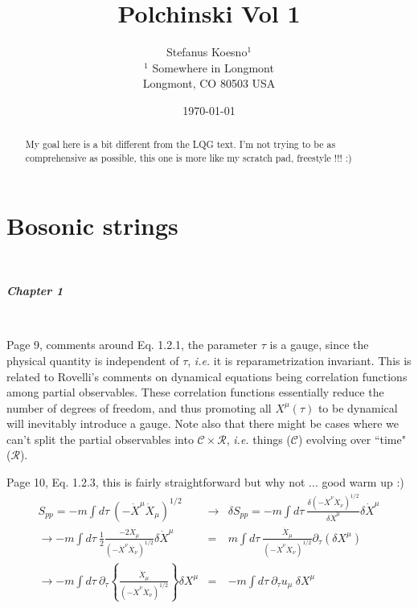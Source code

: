\documentclass[aps,preprint,preprintnumbers,nofootinbib,showpacs,prd]{revtex4-1}
\newcommand{\ie}{{\it i.e.} }
\newcommand{\nbea}{\begin{eqnarray*}}
\newcommand{\neea}{\end{eqnarray*}}
\begin{document}
\title{Polchinski Vol 1}
\bigskip
\author{Stefanus Koesno$^1$\\
$^1$ Somewhere in Longmont\\ Longmont, CO 80503 USA\\
}
%
\date{\today}
%
\begin{abstract}
My goal here is a bit different from the LQG text. I'm not trying to be as comprehensive as possible, this one is more like my scratch pad, freestyle !!! :)

\end{abstract}
%
\maketitle

\section{Bosonic strings}

\renewcommand{\theequation}{A.\arabic{equation}}  %
\setcounter{equation}{0}  %

{\ }

\textbf{\textit {Chapter 1}}

{\ }

Page 9, comments around Eq. 1.2.1, the parameter $\tau$ is a gauge, since the physical quantity is independent of $\tau$, \ie it is reparametrization invariant. This is related to Rovelli's comments on dynamical equations being correlation functions among partial observables. These correlation functions essentially reduce the number of degrees of freedom, and thus promoting all $X^\mu(\tau)$ to be dynamical will inevitably introduce a gauge. Note also that there might be cases where we can't split the partial observables into $\mathcal{C} \times \mathcal{R}$, \ie things ($\mathcal{C}$) evolving over ``time" ($\mathcal{R}$).

Page 10, Eq. 1.2.3, this is fairly straightforward but why not ... good warm up :)
%
\nbea
S_{pp} = -m \int d\tau~\left ( - \dot X^\mu \dot X_\mu \right ) ^{1/2} & \rightarrow & \delta S_{pp} = -m \int d\tau~ \frac {\delta \left ( - \dot X^\nu \dot X_\nu \right ) ^{1/2}} {\delta \dot X^\mu} \delta \dot X^\mu\\
\rightarrow -m \int d\tau~ \frac{1}{2}\frac {-2 \dot X_\mu } {\left ( - \dot X^\nu \dot X_\nu \right ) ^{1/2}} \delta \dot X^\mu & = & m \int d\tau~ \frac {\dot X_\mu } {\left ( - \dot X^\nu \dot X_\nu \right ) ^{1/2}} \partial_\tau (\delta X^\mu)\\
\rightarrow -m \int d\tau~ \partial_\tau \left \{ \frac {\dot X_\mu } {\left ( - \dot X^\nu \dot X_\nu \right ) ^{1/2}} \right \} \delta X^\mu & = & -m \int d\tau~ \partial_\tau u_\mu ~ \delta X^\mu
\neea
%
\end{document}

